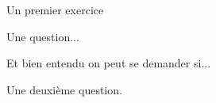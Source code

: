 \begin{exercice}[10 points]
    Un premier exercice
    \begin{question}[3 points]
        Une question...
    \end{question}
    \noindent
    Et bien entendu on peut se demander si...
    \begin{question}[7 points]
        Une deuxième question.
    \end{question}
\end{exercice}
\vspace{1cm}
